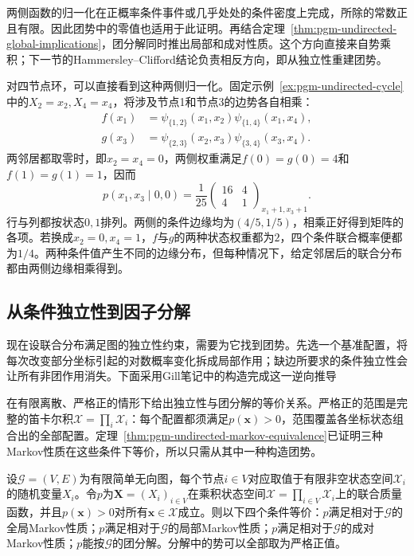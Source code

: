 两侧函数的归一化在正概率条件事件或几乎处处的条件密度上完成，所除的常数正且有限。因此团势中的零值也适用于此证明。再结合定理~\ref{thm:pgm-undirected-global-implications}，团分解同时推出局部和成对性质。这个方向直接来自势乘积；下一节的Hammersley--Clifford结论负责相反方向，即从独立性重建团势。

对四节点环，可以直接看到这种两侧归一化。固定示例~\ref{ex:pgm-undirected-cycle}中的$X_2=x_2,X_4=x_4$，将涉及节点1和节点3的边势各自相乘：
\[
  \begin{aligned}
    f(x_1)&=\psi_{\{1,2\}}(x_1,x_2)\psi_{\{1,4\}}(x_1,x_4),\\
    g(x_3)&=\psi_{\{2,3\}}(x_2,x_3)\psi_{\{3,4\}}(x_3,x_4).
  \end{aligned}
\]
两邻居都取零时，即$x_2=x_4=0$，两侧权重满足$f(0)=g(0)=4$和$f(1)=g(1)=1$，因而
\[
  p(x_1,x_3\mid0,0)
  =\frac{1}{25}
    \begin{pmatrix}16&4\\4&1\end{pmatrix}_{x_1+1,x_3+1}.
\]
行与列都按状态$0,1$排列。两侧的条件边缘均为$(4/5,1/5)$，相乘正好得到矩阵的各项。若换成$x_2=0,x_4=1$，$f$与$g$的两种状态权重都为$2$，四个条件联合概率便都为$1/4$。两种条件值产生不同的边缘分布，但每种情况下，给定邻居后的联合分布都由两侧边缘相乘得到。

\subsection{从条件独立性到因子分解}
\label{sec:pgm-undirected-hammersley-clifford}

现在设联合分布满足图的独立性约束，需要为它找到团势。先选一个基准配置，将每次改变部分坐标引起的对数概率变化拆成局部作用；缺边所要求的条件独立性会让所有非团作用消失。下面采用Gill笔记中的构造完成这一逆向推导

在有限离散、严格正的情形下给出独立性与团分解的等价关系。严格正的范围是完整的笛卡尔积$\mathcal{X}=\prod_i\mathcal{X}_i$：每个配置都须满足$p(\bm{x})>0$，范围覆盖各坐标状态组合出的全部配置。定理~\ref{thm:pgm-undirected-markov-equivalence}已证明三种Markov性质在这些条件下等价，所以只需从其中一种构造团势。

\begin{theorem}
  \label{thm:pgm-undirected-hammersley-clifford}
  设$\mathcal{G}=(V,E)$为有限简单无向图，每个节点$i\in V$对应取值于有限非空状态空间$\mathcal{X}_i$的随机变量$X_i$。令$p$为$\bm{X}=(X_i)_{i\in V}$在乘积状态空间$\mathcal{X}=\prod_{i\in V}\mathcal{X}_i$上的联合质量函数，并且$p(\bm{x})>0$对所有$\bm{x}\in\mathcal{X}$成立。则以下四个条件等价：$p$满足相对于$\mathcal{G}$的全局Markov性质；$p$满足相对于$\mathcal{G}$的局部Markov性质；$p$满足相对于$\mathcal{G}$的成对Markov性质；$p$能按$\mathcal{G}$的团分解。分解中的势可以全部取为严格正值。
\end{theorem}

